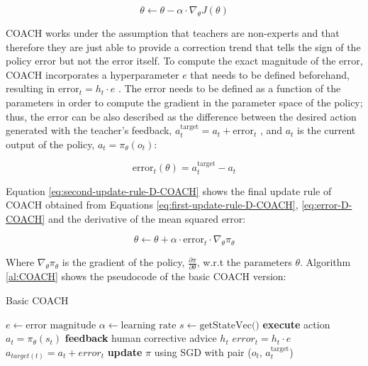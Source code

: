 \begin{equation}
\theta \leftarrow \theta - \alpha \cdot \nabla_\theta J(\theta)
\label{eq:first-update-rule-D-COACH}
\end{equation}

COACH works under the assumption that teachers are non-experts and that therefore they are just able to provide a correction trend that tells the sign of the policy error but not the error itself. To compute the exact magnitude of the error, COACH incorporates a hyperparameter $e$ that needs to be defined beforehand, resulting in $\text{error}_t = h_t \cdot e$  \cite{COACH-Celemin-Ruiz-del-Solar:2015}. The error needs to be defined as a function of the parameters in order to compute the gradient in the parameter space of the policy; thus, the error can be also described as the difference between the desired action generated with the teacher's feedback, $a^\text{target}_t = a_t + \text{error}_t$ , and $a_t$ is the current output of the policy, $a_t = \pi_\theta(o_t)$:


\begin{equation}
\text{error}_t(\theta) = a_t^\text{target} - a_t
\label{eq:error-D-COACH}
\end{equation}


Equation \eqref{eq:second-update-rule-D-COACH} shows the final update rule of COACH obtained from Equations \eqref{eq:first-update-rule-D-COACH}, \eqref{eq:error-D-COACH} and the derivative of the mean squared error:


\begin{equation}
\theta \leftarrow \theta + \alpha \cdot \text{error}_t \cdot \nabla_\theta \pi_\theta
\label{eq:second-update-rule-D-COACH}
\end{equation}



Where $\nabla_\theta \pi_\theta$ is the gradient of the policy, $\frac{\partial \pi}{\partial \theta}$, w.r.t the parameters $\theta$. Algorithm \ref{al:COACH} shows the pseudocode of the basic COACH version:


\begin{algorithm}[H]
\caption{Basic COACH}
\begin{algorithmic}[1]
\State $e \leftarrow \text{error magnitude}$ 
\State $\alpha \leftarrow \text{learning rate}$ 
 {}
\State $s \leftarrow \text{getStateVec()}$
\State \textbf{execute} action $a_{t}=\pi_{\theta}(s_{t})$
\State \textbf{feedback} human corrective advice $h_{t}$
\State $\mathit{error}_{t} = h_{t}\cdot e$
\State $a_{target(t)} = a_{t} + \mathit{error}_{t}$
\State \textbf{update} $\pi$ using SGD with pair ($o_{t}$, $a^{\text{target}}_{t}$)
\EndIf
\EndWhile
\end{algorithmic}
\label{al:COACH}
\end{algorithm}


